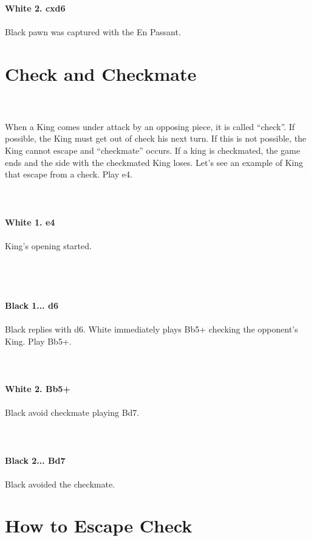 \documentclass{article}
\begin{document}
\\

\\
\\
\textbf{White 2. cxd6}\\
\\
Black pawn was captured with the En Passant.\section{ Check and Checkmate}

\\
\\
When a King comes under attack by an opposing piece, it is called “check”. If possible, the King must get out of check his next turn. If this is not possible, the King cannot escape and “checkmate” occurs. If a king is checkmated, the game ends and the side with the checkmated King loses. Let's see an example of King that escape from a check. Play e4.\\
\\

\\
\\
\textbf{White 1. e4}\\
\\
King's opening started.\\\\
\\

\\
\\
\textbf{Black 1... d6}\\
\\
Black replies with d6. White immediately plays Bb5+ checking the opponent's King. Play Bb5+.\\
\\

\\
\\
\textbf{White 2. Bb5+}\\
\\
Black avoid checkmate playing Bd7.\\
\\

\\
\\
\textbf{Black 2... Bd7}\\
\\
Black avoided the checkmate.\section{ How to Escape Check}
\end{document}
